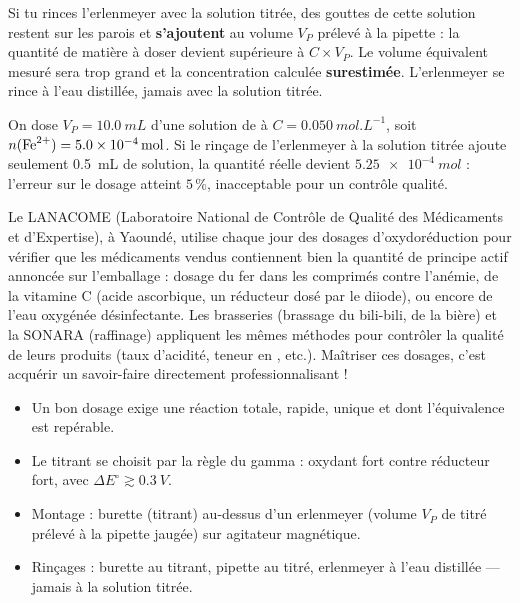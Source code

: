 \documentclass[11pt]{article}
\newcommand{\cle}[1]{{\popxbold\color{popdark}#1}}
\begin{document}
\begin{attention}
Si tu rinces l'erlenmeyer avec la solution titrée, des gouttes de cette solution restent sur les parois et \textbf{s'ajoutent} au volume $V_P$ prélevé à la pipette : la quantité de matière à doser devient supérieure à $C \times V_P$. Le volume équivalent mesuré sera trop grand et la concentration calculée \textbf{surestimée}. L'erlenmeyer se rince à l'eau distillée, jamais avec la solution titrée.
\end{attention}

\begin{exemplebox}
On dose $V_P = \SI{10,0}{mL}$ d'une solution de  à $C = \SI{0,050}{mol.L^{-1}}$, soit $n(\ce{Fe^2+}) = \SI{5,0e-4}{mol}$. Si le rinçage de l'erlenmeyer à la solution titrée ajoute seulement \SI{0,5}{mL} de solution, la quantité réelle devient $\SI{5,25e-4}{mol}$ : l'erreur sur le dosage atteint $5\,\%$, inacceptable pour un contrôle qualité.
\end{exemplebox}

\begin{savaistu}
Le \cle{LANACOME} (Laboratoire National de Contrôle de Qualité des Médicaments et d'Expertise), à Yaoundé, utilise chaque jour des dosages d'oxydoréduction pour vérifier que les médicaments vendus contiennent bien la quantité de principe actif annoncée sur l'emballage : dosage du fer dans les comprimés contre l'anémie, de la vitamine C (acide ascorbique, un réducteur dosé par le diiode), ou encore de l'eau oxygénée désinfectante. Les brasseries (brassage du bili-bili, de la bière) et la \cle{SONARA} (raffinage) appliquent les mêmes méthodes pour contrôler la qualité de leurs produits (taux d'acidité, teneur en , etc.). Maîtriser ces dosages, c'est acquérir un savoir-faire directement professionnalisant !
\end{savaistu}

\begin{aretenir}
\begin{itemize}
\item Un bon dosage exige une réaction \cle{totale}, \cle{rapide}, \cle{unique} et dont l'équivalence est \cle{repérable}.
\item Le titrant se choisit par la \cle{règle du gamma} : oxydant fort contre réducteur fort, avec $\Delta E^{\circ} \gtrsim \SI{0,3}{V}$.
\item Montage : \cle{burette} (titrant) au-dessus d'un \cle{erlenmeyer} (volume $V_P$ de titré prélevé à la pipette jaugée) sur agitateur magnétique.
\item Rinçages : burette au titrant, pipette au titré, erlenmeyer à l'eau distillée — jamais à la solution titrée.
\end{itemize}
\end{aretenir}
\end{document}
